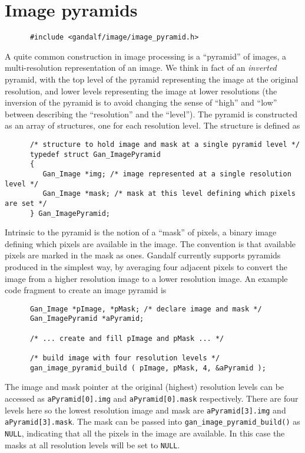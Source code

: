 \section{Image pyramids}
\begin{verbatim}
      #include <gandalf/image/image_pyramid.h>
\end{verbatim}
A quite common construction in image processing is a ``pyramid'' of
images, a multi-resolution representation of an image. We think in fact
of an {\em inverted} pyramid, with the top level of the pyramid representing
the image at the original resolution, and lower levels representing the
image at lower resolutions (the inversion of the pyramid is to avoid
changing the sense of ``high'' and ``low'' between describing the
``resolution'' and the ``level''). The pyramid is constructed as an
array of structures, one for each resolution level. The structure is
defined as
\begin{verbatim}
      /* structure to hold image and mask at a single pyramid level */
      typedef struct Gan_ImagePyramid
      {
         Gan_Image *img; /* image represented at a single resolution level */
         Gan_Image *mask; /* mask at this level defining which pixels are set */
      } Gan_ImagePyramid;
\end{verbatim}
Intrinsic to the pyramid is the notion of a ``mask'' of pixels, a binary
image defining which pixels are available in the image. The convention is
that available pixels are marked in the mask as ones. Gandalf currently
supports pyramids produced in the simplest way, by averaging four adjacent
pixels to convert the image from a higher resolution image to a lower
resolution image. An example code fragment to create an image pyramid is
\begin{verbatim}
      Gan_Image *pImage, *pMask; /* declare image and mask */
      Gan_ImagePyramid *aPyramid;

      /* ... create and fill pImage and pMask ... */

      /* build image with four resolution levels */
      gan_image_pyramid_build ( pImage, pMask, 4, &aPyramid );
\end{verbatim}
The image and mask pointer at the original (highest) resolution levels can
be accessed as {\tt aPyramid[0].img} and {\tt aPyramid[0].mask} respectively.
There are four levels here so the lowest resolution image and mask are
{\tt aPyramid[3].img} and {\tt aPyramid[3].mask}. The mask can be passed
into {\tt gan\_image\_pyramid\_build()} as {\tt NULL}, indicating that
all the pixels in the image are available. In this case the masks at all
resolution levels will be set to {\tt NULL}.

